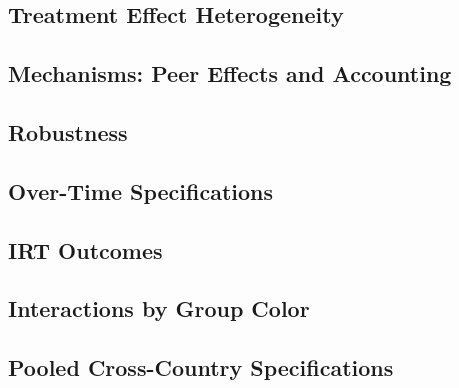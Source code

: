 \documentclass[11pt]{article}
\begin{document}
\subsection*{Treatment Effect Heterogeneity}


\subsection*{Mechanisms: Peer Effects and Accounting}




\subsection*{Robustness}






\subsection*{Over-Time Specifications}




\subsection*{IRT Outcomes}


\subsection*{Interactions by Group Color}









\subsection*{Pooled Cross-Country Specifications}





\end{document}
